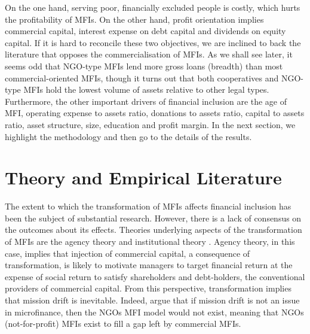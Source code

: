 \documentclass[a4paper, nobind]{templates/ociamthesis}
\begin{document}
On the one hand, serving poor, financially excluded people is costly, which hurts the profitability of MFIs. On the other hand, profit orientation implies commercial capital, interest expense on debt capital and dividends on equity capital. If it is hard to reconcile these two objectives, we are inclined to back the literature that opposes the commercialisation of MFIs. As we shall see later, it seems odd that NGO-type MFIs lend more gross loans (breadth) than most commercial-oriented MFIs, though it turns out that both cooperatives and NGO-type MFIs hold the lowest volume of assets relative to other legal types. Furthermore, the other important drivers of financial inclusion are the age of MFI, operating expense to assets ratio, donations to assets ratio, capital to assets ratio, asset structure, size, education and profit margin. In the next section, we highlight the methodology and then go to the details of the results.

\hypertarget{theory-and-empirical-literature}{%
\section{Theory and Empirical Literature}\label{theory-and-empirical-literature}}

The extent to which the transformation of MFIs affects financial inclusion has been the subject of substantial research. However, there is a lack of consensus on the outcomes about its effects. Theories underlying aspects of the transformation of MFIs are the agency theory \autocite{jensen1976theory} and institutional theory \autocite{powell2012new}. Agency theory, in this case, implies that injection of commercial capital, a consequence of transformation, is likely to motivate managers to target financial return at the expense of social return to satisfy shareholders and debt-holders, the conventional providers of commercial capital. From this perspective, transformation implies that mission drift is inevitable. Indeed, \textcite{morduch2019challenges} argue that if mission drift is not an issue in microfinance, then the NGOs MFI model would not exist, meaning that NGOs (not-for-profit) MFIs exist to fill a gap left by commercial MFIs.
\end{document}
